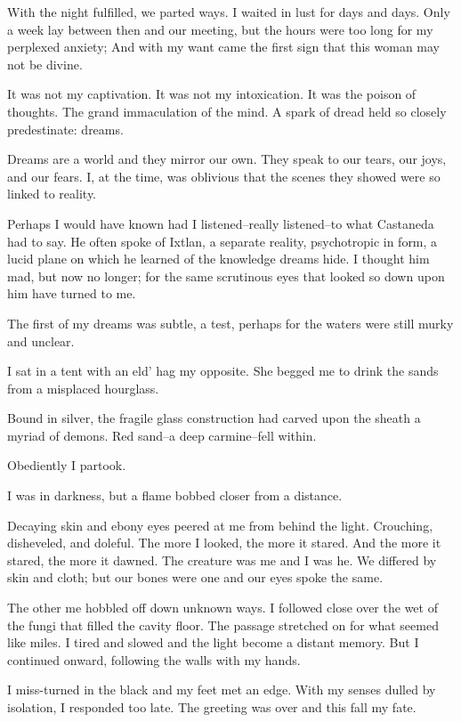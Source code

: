 \documentclass{article}
\begin{document}
With the night fulfilled, we parted ways.
I waited in lust for days and days.
Only a week lay between then and our meeting,
but the hours were too long for my perplexed anxiety;
And with my want came the first sign that this woman may not be divine.


It was not my captivation.
It was not my intoxication.
It was the poison of thoughts.
The grand immaculation of the mind.
A spark of dread held so closely predestinate: dreams.
\VV


\noindent
Dreams are a world and they mirror our own.
They speak to our tears, our joys, and our fears.
I, at the time, was oblivious that the scenes they
showed were so linked to reality.


Perhaps I would have known had I listened--really listened--to
what Castaneda had to say.
He often spoke of Ixtlan,
a separate reality,
psychotropic in form,
a lucid plane on which he learned of the knowledge dreams hide.
I thought him mad, but now no longer;
for the same scrutinous eyes that looked so down upon him
have turned to me.
\VV


\noindent
The first of my dreams was subtle, a test, perhaps
for the waters were still murky and unclear.
\vvvv


\noindent
I sat in a tent with an eld' hag my opposite.
She begged me to drink the sands from a misplaced hourglass.


Bound in silver, the fragile glass construction had
carved upon the sheath a myriad of demons.
Red sand--a deep carmine--fell within.


Obediently I partook.


\noindent
I was in darkness, but a flame bobbed closer from a distance.


Decaying skin and ebony eyes peered at me from behind the light.
Crouching, disheveled, and doleful.
The more I looked, the more it stared.
And the more it stared, the more it dawned.
The creature was me and I was he.
We differed by skin and cloth; but our bones were one
and our eyes spoke the same.


The other me hobbled off down unknown ways.
I followed close over the wet of the fungi that
filled the cavity floor.
The passage stretched on for what seemed like miles.
I tired and slowed and the light become a distant memory.
But I continued onward, following the walls with my hands.


I miss-turned in the black and my feet met an edge.
With my senses dulled by isolation, I responded too late.
The greeting was over and this fall my fate.
\vvvv
\end{document}
